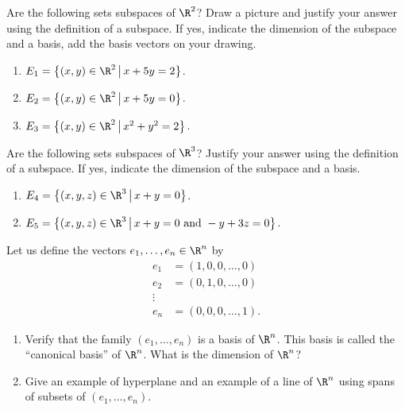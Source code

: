\documentclass[11pt,nocut]{article}
\begin{document}



\vspace{1cm}

\begin{problem}[3 points]
	Are the following sets subspaces of $\R^2$? Draw a picture and justify your answer using the definition of a subspace. If yes, indicate the dimension of the subspace and a basis, add the basis vectors on your drawing.
	\begin{enumerate}[label=\normalfont(\textbf{\alph*})]
		\item $E_1= \big\{ (x,y) \in \R^2 \, \big| \, x + 5y = 2 \big\}$.
		\item $E_2= \big\{ (x,y) \in \R^2 \, \big| \, x + 5y = 0 \big\}$.
		\item $E_3= \big\{ (x,y) \in \R^2 \, \big| \, x^2 + y^2 = 2 \big\}$.
	\end{enumerate}
\end{problem}

\vspace{1mm}

\begin{problem}[2 points]
	Are the following sets subspaces of $\R^3$? Justify your answer using the definition of a subspace. If yes, indicate the dimension of the subspace and a basis.
	\begin{enumerate}[label=\normalfont(\textbf{\alph*})]
		\item $E_4= \big\{ (x,y,z) \in \R^3 \, \big| \, x + y = 0 \big\}$.
		\item $E_5= \big\{ (x,y,z) \in \R^3 \, \big| \, x + y = 0 \text{ and } - y + 3z = 0 \big\}$.
	\end{enumerate}
\end{problem}

\vspace{1mm}


\begin{problem}[2 points]\label{prob:canon}
Let us define the vectors $e_1, \dots, e_n \in \R^n$ by
	\begin{align*}
		e_1 &= (1, 0, 0, \dots, 0) \\
		e_2 &= (0, 1, 0, \dots, 0) \\
		\vdots & \\
		e_n &= (0, 0, 0, \dots, 1).
	\end{align*}
	\begin{enumerate}[label=\normalfont(\textbf{\alph*})]
        \item Verify that the family $(e_1, \dots, e_n)$ is a basis of $\R^n$. This basis is called the ``canonical basis'' of $\R^n$. What is the dimension of $\R^n$? 
        \item Give an example of hyperplane and an example of a line of $\R^n$ using spans of subsets of $(e_1, \dots, e_n)$.
    \end{enumerate}
\end{problem}
\end{document}
